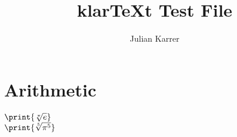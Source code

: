 \documentclass[oneside, a4paper]{article}
\author{Julian Karrer}
\title{klarTeXt Test File}
\begin{document}
\maketitle
\section*{Arithmetic}


\begin{program}

$\print{\sqrt[\pi]{e}}$\\
$\print{\sqrt[5]{\pi^5}}$\\


\end{program}
\end{document}
